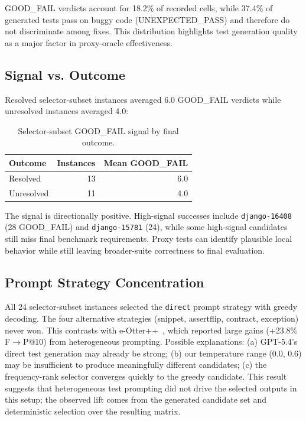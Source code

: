 \documentclass{article}
\begin{document}
GOOD\_FAIL verdicts account for 18.2\% of recorded cells, while 37.4\% of generated tests pass on buggy code (UNEXPECTED\_PASS) and therefore do not discriminate among fixes. This distribution highlights test generation quality as a major factor in proxy-oracle effectiveness.

\subsection{Signal vs. Outcome}

Resolved selector-subset instances averaged 6.0 GOOD\_FAIL verdicts while unresolved instances averaged 4.0:

\begin{table}
\centering
\caption{Selector-subset GOOD\_FAIL signal by final outcome.}
\small
\begin{tabular}{lrr}
\toprule
\textbf{Outcome} & \textbf{Instances} & \textbf{Mean GOOD\_FAIL} \\
\midrule
Resolved & 13 & 6.0 \\
Unresolved & 11 & 4.0 \\
\bottomrule
\end{tabular}
\label{tab:signal-outcome}
\end{table}

The signal is directionally positive. High-signal successes include \texttt{django-16408} (28 GOOD\_FAIL) and \texttt{django-15781} (24), while some high-signal candidates still miss final benchmark requirements. Proxy tests can identify plausible local behavior while still leaving broader-suite correctness to final evaluation.

\subsection{Prompt Strategy Concentration}

All 24 selector-subset instances selected the \texttt{direct} prompt strategy with greedy decoding. The four alternative strategies (snippet, assertflip, contract, exception) never won. This contrasts with e-Otter++~\cite{chen2024e}, which reported large gains (+23.8\% F$\rightarrow$P@10) from heterogeneous prompting. Possible explanations: (a) GPT-5.4's direct test generation may already be strong; (b) our temperature range (0.0, 0.6) may be insufficient to produce meaningfully different candidates; (c) the frequency-rank selector converges quickly to the greedy candidate. This result suggests that heterogeneous test prompting did not drive the selected outputs in this setup; the observed lift comes from the generated candidate set and deterministic selection over the resulting matrix.
\end{document}
